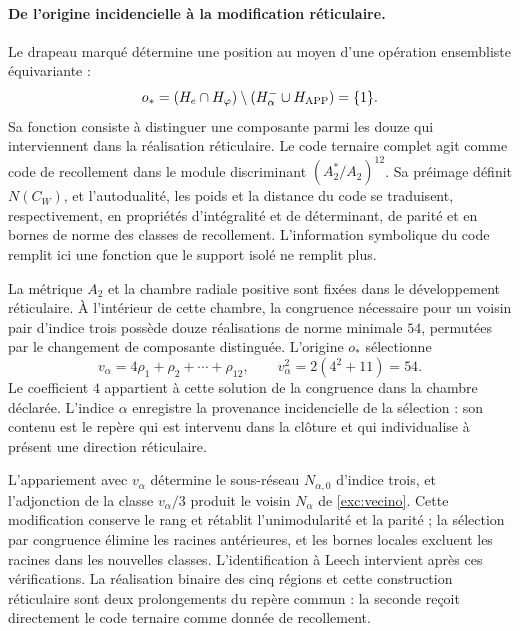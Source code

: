 \paragraph{De l'origine incidencielle à la modification réticulaire.}
\label{inc-ampl-reticulo}
Le drapeau marqué détermine une position au moyen d'une opération
ensembliste équivariante :
\[
 o_*=(H_e\cap H_\varphi)
       \setminus(H^-_\alpha\cup H_{\rm APP})=\{1\}.
\]
Sa fonction consiste à distinguer une composante parmi les douze qui
interviennent dans la réalisation réticulaire. Le code ternaire complet
agit comme code de recollement dans le module discriminant
$(A_2^*/A_2)^{12}$. Sa préimage définit $N(C_W)$, et
l'autodualité, les poids et la distance du code se traduisent,
respectivement, en propriétés d'intégralité et de déterminant, de parité
et en bornes de norme des classes de recollement. L'information symbolique
du code remplit ici une fonction que le support isolé ne remplit plus.

La métrique $A_2$ et la chambre radiale positive sont fixées dans le développement
réticulaire. À l'intérieur de cette chambre, la congruence nécessaire pour un voisin
pair d'indice trois possède douze réalisations de norme minimale $54$,
permutées par le changement de composante distinguée. L'origine $o_*$
sélectionne
\[
 v_\alpha=4\rho_1+\rho_2+\cdots+\rho_{12},\qquad
 v_\alpha^2=2(4^2+11)=54.
\]
Le coefficient $4$ appartient à cette solution de la congruence dans la
chambre déclarée. L'indice $\alpha$ enregistre la provenance
incidencielle de la sélection : son contenu est le repère qui est intervenu dans
la clôture et qui individualise à présent une direction réticulaire.

L'appariement avec $v_\alpha$ détermine le sous-réseau
$N_{\alpha,0}$ d'indice trois, et l'adjonction de la classe
$v_\alpha/3$ produit le voisin $N_\alpha$ de
\eqref{exc:vecino}. Cette modification conserve le rang et rétablit
l'unimodularité et la parité ; la sélection par congruence élimine les racines
antérieures, et les bornes locales excluent les racines dans les nouvelles classes.
L'identification à Leech intervient après ces vérifications. La
réalisation binaire des cinq régions et cette construction réticulaire
sont deux prolongements du repère commun : la seconde reçoit directement
le code ternaire comme donnée de recollement.

